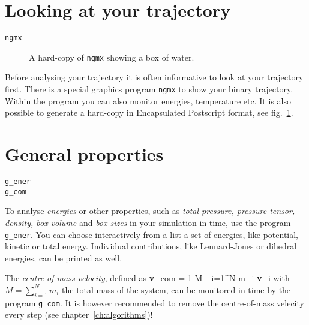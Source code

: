 \section{Looking at your trajectory}
\label{sec:lookwhostalking}
\begin{verbatim}
ngmx
\end{verbatim}
%
\begin{figure}
\centerline{
{}}
\caption{A hard-copy of {\tt ngmx} showing a box of water.}
\label{fig:ngmxdump}
\end{figure}
%
Before analysing your trajectory it is often informative to look at your 
trajectory first. There is a special graphics program {\tt ngmx} to show your 
binary trajectory. Within the program you can also monitor energies, 
temperature etc. It is also possible to generate a hard-copy in Encapsulated 
Postscript format, see fig.~\ref{fig:ngmxdump}.
%
%
\section{General properties}
\label{sec:genprop}
\begin{verbatim}
g_ener
g_com
\end{verbatim}
To analyse {\em energies} or other properties, such as {\em total pressure,
pressure tensor, density, box-volume} and {\em box-sizes}
in your simulation in time, use the program {\tt g\_ener}.
You can choose interactively from a list a set 
of energies, like potential, kinetic or total energy. Individual 
contributions, like Lennard-Jones or dihedral energies, can be printed as well.

The {\em centre-of-mass velocity}, defined as
\beq
{\bf v}_{com} = {1 \over M} \sum_{i=1}^N m_i {\bf v}_i
\eeq
with $M = \sum_{i=1}^N m_i$ the total mass of the system, can be monitored 
in time by the program {\tt g\_com}. It is however recommended to remove the 
centre-of-mass velecity every step (see chapter~\ref{ch:algorithms})!
%
%
